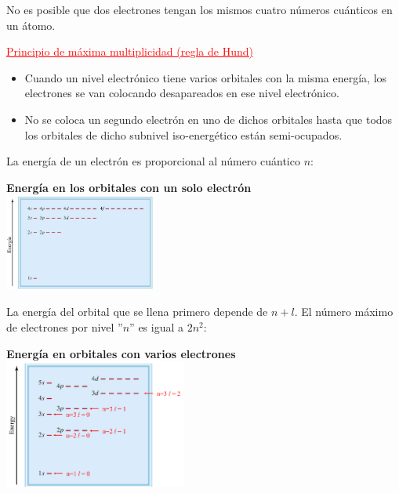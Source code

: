         \indent No es posible que dos electrones tengan los mismos cuatro números cuánticos en un átomo.
        
        \begin{center} \textcolor{red}{\underline{Principio de máxima multiplicidad (regla de Hund)}} \end{center}

        \begin{itemize} 
            \item Cuando un nivel electrónico tiene varios orbitales con la misma energía, los electrones se van colocando desapareados en ese nivel electrónico.
            \item No se coloca un segundo electrón en uno de dichos orbitales hasta que todos los orbitales de dicho subnivel iso-energético están semi-ocupados.
        \end{itemize}

        \indent La energía de un electrón es proporcional al número cuántico $n$:
        \begin{center} 
            \textbf{Energía en los orbitales con un solo electrón} \\[5pt]
            \includegraphics[width=5cm]{./imagenes/orbitalesEnergia.png}
        \end{center}

        \indent La energía del orbital que se llena primero depende de $n + l$. El número máximo de electrones por nivel ''$n$'' es igual a $2n^2$:
        \saltoPag
        \begin{center} \textbf{Energía en orbitales con varios electrones} \\[5pt] \includegraphics[width=6cm]{./imagenes/energiaOrbitalesConVariosElectrones.png} \end{center}

